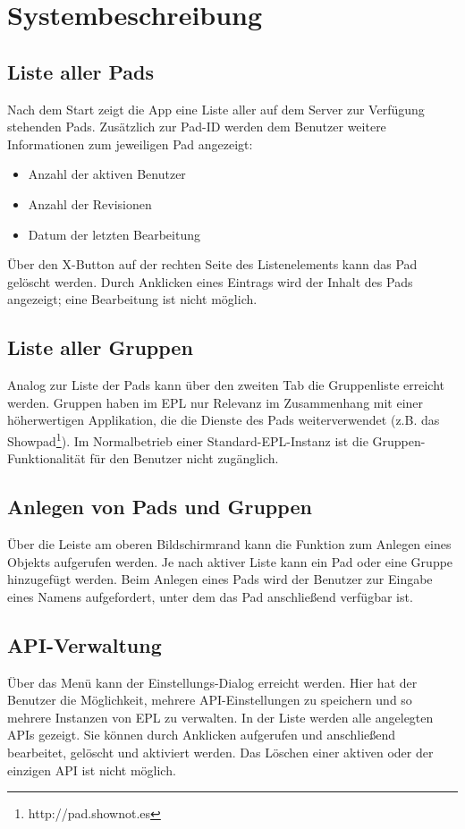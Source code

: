 \section{Systembeschreibung}
\subsection{Liste aller Pads}
Nach dem Start zeigt die App eine Liste aller auf dem Server zur Verfügung stehenden Pads.
Zusätzlich zur Pad-ID werden dem Benutzer weitere Informationen zum jeweiligen Pad angezeigt:
\begin{itemize}
	\item Anzahl der aktiven Benutzer
	\item Anzahl der Revisionen
	\item Datum der letzten Bearbeitung
\end{itemize}

Über den X-Button auf der rechten Seite des Listenelements kann das Pad gelöscht werden.
Durch Anklicken eines Eintrags wird der Inhalt des Pads angezeigt; eine Bearbeitung ist nicht möglich.

\subsection{Liste aller Gruppen}
Analog zur Liste der Pads kann über den zweiten Tab die Gruppenliste erreicht werden. Gruppen haben im EPL nur Relevanz im Zusammenhang mit einer höherwertigen Applikation, die die Dienste des Pads weiterverwendet (z.B. das Showpad\footnote{http://pad.shownot.es}).
Im Normalbetrieb einer Standard-EPL-Instanz ist die Gruppen-Funktionalität für den Benutzer nicht zugänglich.

\subsection{Anlegen von Pads und Gruppen}
Über die Leiste am oberen Bildschirmrand kann die Funktion zum Anlegen eines Objekts aufgerufen werden.
Je nach aktiver Liste kann ein Pad oder eine Gruppe hinzugefügt werden.
Beim Anlegen eines Pads wird der Benutzer zur Eingabe eines Namens aufgefordert, unter dem das Pad anschließend verfügbar ist.

\subsection{API-Verwaltung}
Über das Menü kann der Einstellungs-Dialog erreicht werden.
Hier hat der Benutzer die Möglichkeit, mehrere API-Einstellungen zu speichern und so mehrere Instanzen von EPL zu verwalten.
In der Liste werden alle angelegten APIs gezeigt.
Sie können durch Anklicken aufgerufen und anschließend bearbeitet, gelöscht und aktiviert werden.
Das Löschen einer aktiven oder der einzigen API ist nicht möglich.


